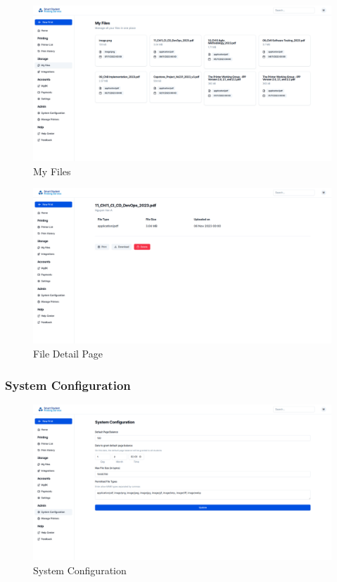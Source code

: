 \begin{figure}[H]
    \centering
    \includegraphics[max width = 0.9\linewidth,origin = c]{chapters/8. Implementation - Sprint 2/8. my files.png}
    \caption{My Files}%
\end{figure}
\begin{figure}[H]
    \centering
    \includegraphics[max width = 0.9\linewidth,origin = c]{chapters/8. Implementation - Sprint 2/9. files - details.png}
    \caption{File Detail Page}%
\end{figure}

\subsubsection{System Configuration}

\begin{figure}[H]
    \centering
    \includegraphics[max width = 0.9\linewidth,origin = c]{chapters/8. Implementation - Sprint 2/10. system configuration.png}
    \caption{System Configuration}%
\end{figure}

